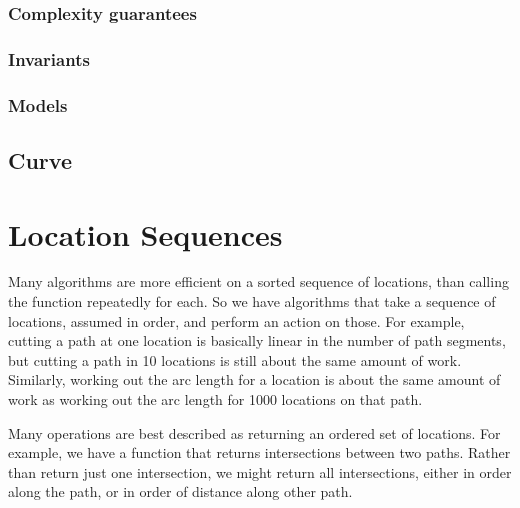 \documentclass[openany]{book}
\begin{document}
\subsubsection{Complexity guarantees}

\subsubsection{Invariants}

\subsubsection{Models}

\subsection{Curve}

\section{Location Sequences}

Many algorithms are more efficient on a sorted sequence of locations,
than calling the function repeatedly for each.  So we have algorithms
that take a sequence of locations, assumed in order, and perform an
action on those.  For example, cutting a path at one location is
basically linear in the number of path segments, but cutting a path in
10 locations is still about the same amount of work.  Similarly,
working out the arc length for a location is about the same amount of
work as working out the arc length for 1000 locations on that path.

Many operations are best described as returning an ordered set of
locations.  For example, we have a function that returns
intersections between two paths.  Rather than return just one
intersection, we might return all intersections, either in order along
the path, or in order of distance along other path.
\end{document}
